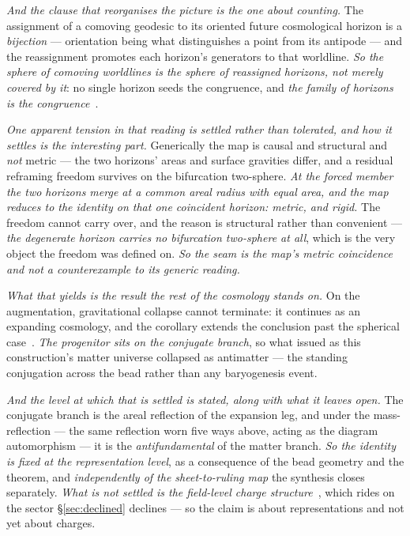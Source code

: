 \documentclass[11pt,a4paper]{article}
\theoremstyle{plain}
\theoremstyle{definition}
\begin{document}
\emph{And the clause that reorganises the picture is the one about counting.} The assignment of a comoving
geodesic to its oriented future cosmological horizon is a \emph{bijection} --- orientation being what
distinguishes a point from its antipode --- and the reassignment promotes each horizon's generators to that
worldline. \emph{So the sphere of comoving worldlines is the sphere of reassigned horizons, not merely
covered by it}: no single horizon seeds the congruence, and \emph{the family of horizons is the
congruence}~\cite{JanzenCRframework}.

\emph{One apparent tension in that reading is settled rather than tolerated, and how it settles is the
interesting part.} Generically the map is causal and structural and \emph{not} metric --- the two horizons'
areas and surface gravities differ, and a residual reframing freedom survives on the bifurcation two-sphere.
\emph{At the forced member the two horizons merge at a common areal radius with equal area, and the map
reduces to the identity on that one coincident horizon: metric, and rigid.} The freedom cannot carry over,
and the reason is structural rather than convenient --- \emph{the degenerate horizon carries no bifurcation
two-sphere at all}, which is the very object the freedom was defined on. \emph{So the seam is the map's
metric coincidence and not a counterexample to its generic reading.}

\emph{What that yields is the result the rest of the cosmology stands on.} On the augmentation, gravitational
collapse cannot terminate: it continues as an expanding cosmology, and the corollary extends the conclusion
past the spherical case~\cite{JanzenCRframework}. \emph{The progenitor sits on the conjugate branch}, so what
issued as this construction's matter universe collapsed as antimatter --- the standing conjugation across the
bead rather than any baryogenesis event.

\emph{And the level at which that is settled is stated, along with what it leaves open.} The conjugate branch
is the areal reflection of the expansion leg, and under the mass-reflection --- the same reflection worn five
ways above, acting as the diagram automorphism --- it is the \emph{antifundamental} of the
matter branch. \emph{So the identity is fixed at the representation level}, as a consequence of the bead
geometry and the theorem, and \emph{independently of the sheet-to-ruling map} the synthesis closes
separately. \emph{What is not settled is the field-level charge structure}~\cite{JanzenCRframework}, which
rides on the sector \S\ref{sec:declined} declines --- so the claim is about representations and not yet about
charges.
\end{document}
